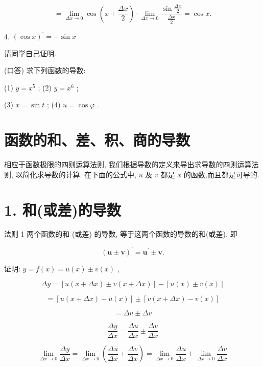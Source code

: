 \documentclass[lang=cn,newtx,10pt,scheme=chinese]{elegantbook}
\begin{document}
\[
= \mathop{\lim }\limits_{{{\Delta x} \rightarrow 0}}\cos \left( {x + \frac{\Delta x}{2}}\right) \cdot \mathop{\lim }\limits_{{{\Delta x} \rightarrow 0}}\frac{\sin \frac{\Delta x}{2}}{\frac{\Delta x}{2}} = \cos x.
\]

4. \({\left( \cos x\right) }^{\prime } = - \sin x\)

请同学自己证明.

\begin{problemset}[练习]

\item (口答) 求下列函数的导数:

(1) \(y = {x}^{5}\) ; (2) \(y = {x}^{6}\) ;

(3) \(x = \sin t\) ; (4) \(u = \cos \varphi\) .

\end{problemset}

\section{函数的和、差、积、商的导数}

相应于函数极限的四则运算法则, 我们根据导数的定义来导出求导数的四则运算法则, 以简化求导数的计算. 在下面的公式中, \(u\) 及 \(v\) 都是 \(x\) 的函数,而且都是可导的.

\section*{1. 和(或差)的导数}

法则 1 两个函数的和 (或差) 的导数, 等于这两个函数的导数的和(或差). 即

\[
{\left( \mathbf{u} \pm \mathbf{v}\right) }^{\prime } = {\mathbf{u}}^{\prime } \pm \mathbf{v}.
\]

证明: \(y = f\left( x\right) = u\left( x\right) \pm v\left( x\right)\) ,

\[
{\Delta y} = \left\lbrack {u\left( {x + {\Delta x}}\right) \pm v\left( {x + {\Delta x}}\right) }\right\rbrack - \left\lbrack {u\left( x\right) \pm v\left( x\right) }\right\rbrack
\]

\[
= \left\lbrack {u\left( {x + {\Delta x}}\right) - u\left( x\right) }\right\rbrack \pm \left\lbrack {v\left( {x + {\Delta x}}\right) - v\left( x\right) }\right\rbrack
\]

\[
= {\Delta u} \pm {\Delta v}
\]

\[
\frac{\Delta y}{\Delta x} = \frac{\Delta u}{\Delta x} \pm \frac{\Delta v}{\Delta x}
\]

\[
\mathop{\lim }\limits_{{{\Delta x} \rightarrow 0}}\frac{\Delta y}{\Delta x} = \mathop{\lim }\limits_{{{\Delta x} \rightarrow 0}}\left( {\frac{\Delta u}{\Delta x} \pm \frac{\Delta v}{\Delta x}}\right) = \mathop{\lim }\limits_{{{\Delta x} \rightarrow 0}}\frac{\Delta u}{\Delta x} \pm \mathop{\lim }\limits_{{{\Delta x} \rightarrow 0}}\frac{\Delta v}{\Delta x}
\]
\end{document}
